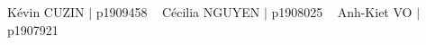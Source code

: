 Kévin CUZIN $\vert$ p1909458 ~\newline
 Cécilia NGUYEN $\vert$ p1908025 ~\newline
 Anh-\/\+Kiet VO $\vert$ p1907921 ~\newline




 ~\newline
 